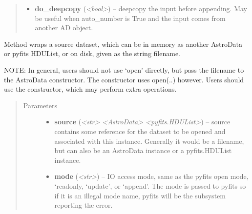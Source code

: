 \documentclass[letterpaper,10pt,english]{sphinxmanual}
\begin{document}
\begin{fulllineitems}
\begin{fulllineitems}
\begin{quote}
\begin{description}
\begin{itemize}
\item {} 
\textbf{do\_deepcopy} (\emph{\textless{}bool\textgreater{}}) -- deepcopy the input before appending. May be useful
when auto\_number is True and the input comes from
another AD object.

\end{itemize}

\end{description}\end{quote}

\end{fulllineitems}


\begin{fulllineitems}
\label{astro_class:astrodata.AstroData.AstroData.open}
Method wraps a source dataset, which can be in memory as another
AstroData or pyfits HDUList, or on disk, given as the string filename.

NOTE: In general, users should not use `open' directly, but pass
the filename to the AstroData constructor. The constructor uses
open(..) however. Users should use the constructor, which may 
perform extra operations.
\begin{quote}\begin{description}
\item[{Parameters}] \leavevmode\begin{itemize}
\item {} 
\textbf{source} (\emph{\textless{}str\textgreater{} \textbar{} \textless{}AstroData\textgreater{} \textbar{} \textless{}pyfits.HDUList\textgreater{}}) -- source contains some reference for the dataset to 
be opened and associated with this instance. Generally
it would be a filename, but can also be
an AstroData instance or a pyfits.HDUList instance.

\item {} 
\textbf{mode} (\emph{\textless{}str\textgreater{}}) -- IO access mode, same as the pyfits open mode, `readonly,
`update', or `append'.  The mode is passed to pyfits so
if it is an illegal mode name, pyfits will be the
subsystem reporting the error.

\end{itemize}

\end{description}\end{quote}

\end{fulllineitems}


\end{fulllineitems}
\end{document}

